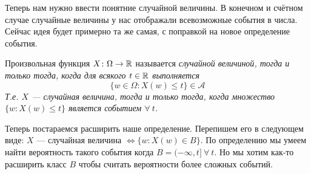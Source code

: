 Теперь нам нужно ввести понятние случайной величины. В конечном и счётном случае случайные величины у нас отображали
всевозможные события в числа. Сейчас идея будет примерно та же самая, с поправкой на новое определение события.
\begin{definition}
    Произвольная функция $X \colon \Omega \to \mathbb{R}$ называется \it{случайной величиной}, тогда и только тогда, когда
    для всякого $t \in \mathbb{R}$ выполняется
    \[
        \{w \in \Omega \colon X(w) \leq t\} \in \mathcal{A}
    \]
    Т.е. $X$ --- случайная величина, тогда и только тогда, когда множество $\{w \colon X(w) \leq t\}$ является событием $\forall ~ t$.
\end{definition}
\begin{comment}
    Заметим следующее:
    \[
        \{w \in \Omega \colon X(w) \leq t\} = \{w \in \Omega \colon X(w) \in (-\infty; t]\}
    \]
    Т.е. то множество, которое мы хотим считать событием при любом $t$ состоит из исходов, которые под действием случайной
    величины $X$ попадают в множество $(-\infty; t]$. Т.е. это множество по определению является полным прообразом множества
    $\{X(w) \colon X(w) \in (-\infty; t]\} = X((-\infty; t])$, и мы соответственно его будет обозначать как $X^{-1}((-\infty; t])$.
\end{comment}
Теперь постараемся расширить наше определение. Перепишем его в следующем виде: $X$ --- случайная величина $\iff
\{w \colon X(w) \in B\}$. По определению мы умеем найти вероятность такого события когда $B = (-\infty, t] ~ \forall ~ t$.
Но мы хотим как-то расширить класс $B$ чтобы считать вероятности более сложных событий.

